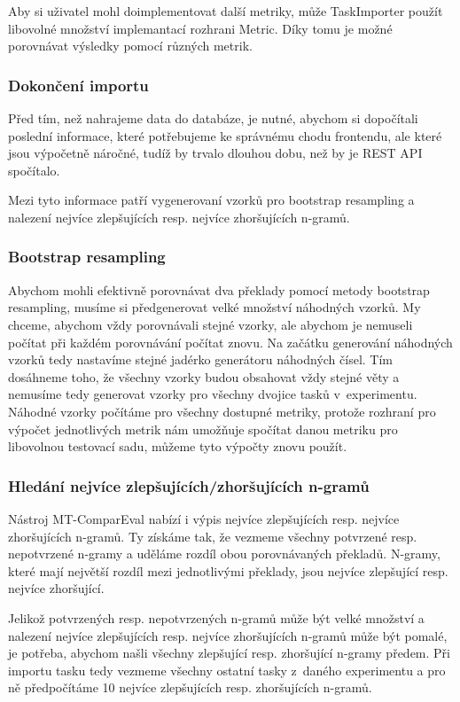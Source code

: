 Aby si uživatel mohl doimplementovat další metriky,
  může TaskImporter použít libovolné množství implemantací rozhrani Metric.
Díky tomu je možné porovnávat výsledky pomocí různých metrik.

\subsubsection{Dokončení importu}
Před tím, než nahrajeme data do databáze, je nutné,
  abychom si dopočítali poslední informace,
  které potřebujeme ke správnému chodu frontendu,
  ale které jsou výpočetně náročné,
  tudíž by trvalo dlouhou dobu,
  než by je REST API spočítalo.

Mezi tyto informace patří vygenerovaní vzorků pro bootstrap resampling a
  nalezení nejvíce zlepšujících resp. nejvíce zhoršujících \mbox{n-gramů}.

\subsubsection{Bootstrap resampling}
Abychom mohli efektivně porovnávat dva překlady pomocí metody bootstrap resampling,
  musíme si předgenerovat velké množství náhodných vzorků.
My chceme,
  abychom vždy porovnávali stejné vzorky,
  ale abychom je nemuseli počítat při každém porovnávání počítat znovu.
Na začátku generování náhodných vzorků tedy nastavíme stejné jadérko generátoru náhodných čísel.
Tím dosáhneme toho,
  že všechny vzorky budou obsahovat vždy stejné věty
  a nemusíme tedy generovat vzorky pro všechny dvojice tasků v~experimentu.
Náhodné vzorky počítáme pro všechny dostupné metriky,
  protože rozhraní pro výpočet jednotlivých metrik nám umožňuje spočítat danou metriku pro libovolnou testovací sadu,
  můžeme tyto výpočty znovu použít.


\subsubsection{Hledání nejvíce zlepšujících/zhoršujících \mbox{n-gramů}}
Nástroj MT-ComparEval nabízí i výpis nejvíce zlepšujících resp. nejvíce zhoršujících \mbox{n-gramů}.
Ty získáme tak, že vezmeme všechny potvrzené resp. nepotvrzené \mbox{n-gramy}
  a uděláme rozdíl obou porovnávaných překladů.
N-gramy,
  které mají největší rozdíl mezi jednotlivými překlady,
  jsou nejvíce zlepšující resp. nejvíce zhoršující.

Jelikož potvrzených resp. nepotvrzených \mbox{n-gramů} může být velké množství
  a nalezení nejvíce zlepšujících resp. nejvíce zhoršujících \mbox{n-gramů} může být pomalé,
  je potřeba,
  abychom našli všechny zlepšující resp. zhoršující \mbox{n-gramy} předem.
Při importu tasku tedy vezmeme všechny ostatní tasky z~daného experimentu
  a pro ně předpočítáme 10 nejvíce zlepšujících resp. zhoršujících \mbox{n-gramů}. 


